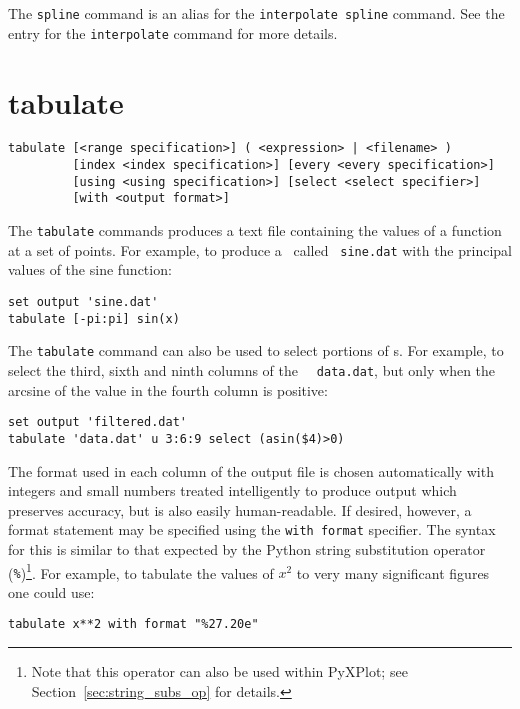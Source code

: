 The {\tt spline} command is an alias for the {\tt interpolate spline} command.
See the entry for the {\tt interpolate} command for more details.

\section{tabulate}

\begin{verbatim}
tabulate [<range specification>] ( <expression> | <filename> )
         [index <index specification>] [every <every specification>]
         [using <using specification>] [select <select specifier>]
         [with <output format>]
\end{verbatim}

The {\tt tabulate} commands produces a text file containing the values of a
function at a set of points.  For example, to produce a \datafile\ called {\tt
sine.dat} with the principal values of the sine function:

\begin{verbatim}
set output 'sine.dat'
tabulate [-pi:pi] sin(x)
\end{verbatim}

The {\tt tabulate} command can also be used to select portions of \datafile s.
For example, to select the third, sixth and ninth columns of the \datafile\ {\tt
data.dat}, but only when the arcsine of the value in the fourth column is
positive:

\begin{verbatim}
set output 'filtered.dat'
tabulate 'data.dat' u 3:6:9 select (asin($4)>0)
\end{verbatim}

The format used in each column of the output file is chosen automatically with
integers and small numbers treated intelligently to produce output which
preserves accuracy, but is also easily human-readable. If desired, however, a
format statement may be specified using the {\tt with format} specifier. The
syntax for this is similar to that expected by the Python string substitution
operator ({\tt \%})\footnote{Note that this operator can also be used
within PyXPlot; see Section~\ref{sec:string_subs_op} for details.}.  For example,
to tabulate the values of $x^2$ to very many significant figures one could use:

\begin{verbatim}
tabulate x**2 with format "%27.20e"
\end{verbatim}

